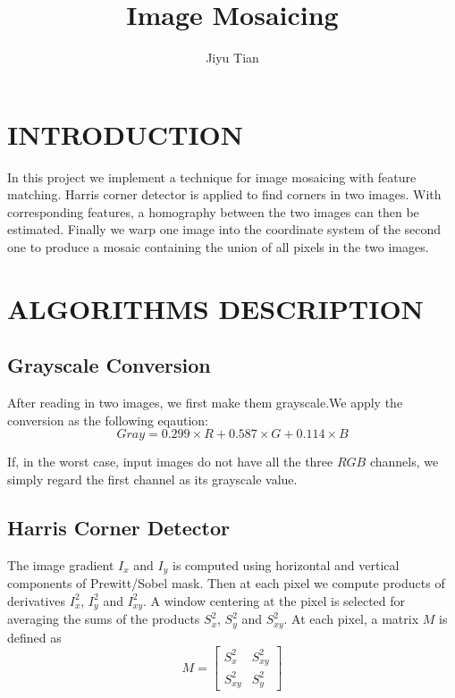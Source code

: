 \documentclass[letterpaper, 10 pt, conference]{ieeeconf}
\title{\Huge Image Mosaicing}
\author{Jiyu Tian}
\begin{document}
\maketitle
\thispagestyle{empty}
\pagestyle{empty}


\section{INTRODUCTION}
In this project we implement a technique for image mosaicing with feature matching. 
Harris corner detector is applied to find corners in two images. With corresponding features, a homography between the two images can then be estimated. Finally we warp one image into the coordinate system of the second one to produce a mosaic containing the union of all pixels in the two images.
\section{ALGORITHMS DESCRIPTION}
\subsection{Grayscale Conversion}
After reading in two images, we first make them grayscale.We apply the conversion as the following eqaution:
\begin{equation}
Gray = 0.299 \times R + 0.587 \times G + 0.114 \times B
\end{equation}

If, in the worst case, input images do not have all the three $RGB$ channels, we simply regard the first channel as its grayscale value.
\subsection{Harris Corner Detector}
The image gradient $I_x$ and $I_y$ is computed using horizontal and vertical components of Prewitt/Sobel mask. Then at each pixel we compute products of derivatives $I^2_x$, $I^2_y$ and $I^2_{xy}$. A window centering at the pixel is selected for averaging the sums of the products $S^2_x$, $S^2_y$ and $S^2_{xy}$.
At each pixel, a matrix $M$ is defined as 
\begin{equation}
M=\left[ \begin{array}{cc}
S^2_x & S^2_{xy}\\
S^2_{xy} & S^2_y
\end{array} \right]
\end{equation}
\end{document}
